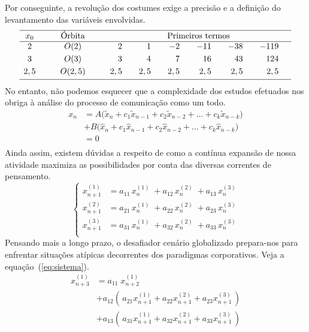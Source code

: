 \documentclass[fleqn]{icat-ufal}
\begin{document}
Por conseguinte, a revolução dos costumes exige a precisão e a
definição do levantamento das variáveis envolvidas. 
\[
\begin{array}{ccrrrrrr}     \hline
x_0  &
{\qquad \text{Órbita} \qquad} &
\multicolumn{6}{c}{\text{Primeiros termos}} \\ \hline 
2   & O(2  )  &   2 &\quad   1 &\quad   -2 &\quad  -11 &\quad  -38 &\quad -119 \quad  \\[1mm]
3   & O(3  )  &   3 &\quad   4 &\quad    7 &\quad   16 &\quad   43 &\quad  124 \quad  \\[1mm]
2,5 & O(2,5)  & 2,5 &\quad 2,5 &\quad  2,5 &\quad  2,5 &\quad  2,5 &\quad  2,5 \quad  \\[1mm] \hline
\end{array}
\]
No entanto, não podemos esquecer que a complexidade dos estudos efetuados nos
obriga à análise do processo de comunicação como um todo.
\[
\begin{split}
x_n & = A \big( \tilde{x}_n + c_1\tilde{x}_{n-1} + c_2\tilde{x}_{n-2} + \dots + c_k\tilde{x}_{n-k} \big) \\
& + B \big(   \hat{x}_n + c_1  \hat{x}_{n-1} + c_2  \hat{x}_{n-2} + \dots + c_k  \hat{x}_{n-k} \big) \\
& = 0 \\
\end{split}
\]
Ainda assim, existem dúvidas a respeito de como a contínua expansão de nossa
atividade maximiza as possibilidades por conta das diversas correntes de
pensamento.
\begin{equation}
    \label{eq:sistema}
    \left\{
    \begin{split}
        x_{n+1}^{(1)} & = a_{11}\, x_{n}^{(1)} \; + a_{12}\, x_{n}^{(2)} \; + a_{13}\, x_{n}^{(3)} \\[2mm]
        x_{n+1}^{(2)} & = a_{21}\, x_{n}^{(1)} \; + a_{22}\, x_{n}^{(2)} \; + a_{23}\, x_{n}^{(3)} \\[2mm]
        x_{n+1}^{(3)} & = a_{31}\, x_{n}^{(1)} \; + a_{32}\, x_{n}^{(2)} \; + a_{33}\, x_{n}^{(3)} \\
    \end{split}
\right.
\end{equation}
Pensando mais a longo prazo, o desafiador cenário globalizado prepara-nos para
enfrentar situações atípicas decorrentes dos paradigmas corporativos. 
Veja a equação~(\ref{eq:sistema}).
\begin{equation}
\begin{split}
        x_{n+3}^{(1)} & = a_{11}\; x_{n+2}^{(1)}                                                                  \\[2mm]
                      & + a_{12} \left( \, a_{21}x_{n+1}^{(1)}+a_{22}x_{n+1}^{(2)}+a_{23}x_{n+1}^{(3)} \, \right) \\[2mm]
                      & + a_{13} \left( \, a_{31}x_{n+1}^{(1)}+a_{32}x_{n+1}^{(2)}+a_{33}x_{n+1}^{(3)} \, \right)
\end{split}
\end{equation}
\end{document}
